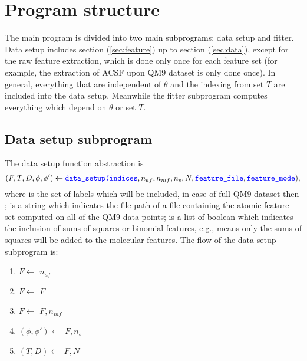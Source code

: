 \documentclass[12pt]{article}
\begin{document}
\section{Program structure}
The main program is divided into two main subprograms: data setup and fitter. Data setup includes section (\ref{sec:feature}) up to section (\ref{sec:data}), except for the raw feature extraction, which is done only once for each feature set (for example, the extraction of ACSF upon QM9 dataset is only done once). In general, everything that are independent of $\theta$ and the indexing from set $T$ are included into the data setup. Meanwhile the fitter subprogram computes everything which depend on $\theta$ or set $T$.

\subsection{Data setup subprogram}
\label{sub:data}
The data setup function abstraction is
\begin{equation*}
	(F, T, D, \phi, \phi') \leftarrow \codeword{data_setup(indices}, n_{af}, n_{mf}, n_s, N, \codeword{feature_file}, \codeword{feature_mode}),
\end{equation*}
where  is the set of labels which will be included, in case of full QM9 dataset then ;  is a string which indicates the file path of a file containing the atomic feature set computed on all of the QM9 data points;  is a list of boolean which indicates the inclusion of sums of squares or binomial features, e.g.,  means only the sums of squares will be added to the molecular features. The flow of the data setup subprogram is:
\begin{enumerate}
	\item $F \leftarrow$  $n_{af}$\codeword{)}
	\item $F \leftarrow$ $F$
	\item $F \leftarrow$ $F, n_{mf}$\codeword{)}
	\item $(\phi, \phi') \leftarrow$ $F, n_s$\codeword{)} 
	\item $(T, D) \leftarrow$ $F, N$\codeword{)}
\end{enumerate}
\end{document}
